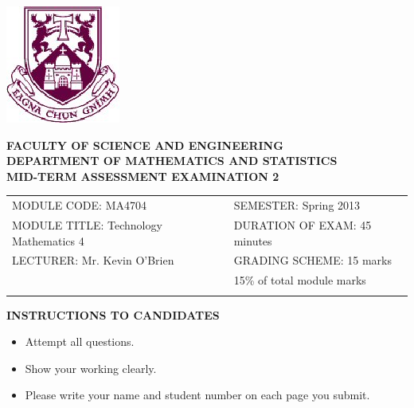 \documentclass{article}
\begin{document}
\begin{center}
       \includegraphics[scale=0.60]{shieldtransparent2}
\end{center}

\begin{center}
\vspace{1cm}
\large \bf {FACULTY OF SCIENCE AND ENGINEERING} \\[0.5cm]
\normalsize DEPARTMENT OF MATHEMATICS AND STATISTICS \\[1.25cm]
\large \bf {MID-TERM ASSESSMENT EXAMINATION 2} \\[1.5cm]
\end{center}

\begin{tabular}{ll}
MODULE CODE: MA4704 & SEMESTER: Spring 2013\\[1cm]
MODULE TITLE: Technology Mathematics 4 & DURATION OF EXAM: 45 minutes \\[1cm]
LECTURER: Mr. Kevin O'Brien & GRADING SCHEME: 15 marks \\
& \phantom{GRADING SCHEME:} \footnotesize {15\% of total module marks} \\[0.2cm]
\\[1cm]
\end{tabular}
\begin{center}
{\bf INSTRUCTIONS TO CANDIDATES}
\end{center}
\begin{itemize}
\item Attempt all questions.
\item Show your working clearly.
\item Please write your name and student number on each page you submit.
\end{itemize}
\end{document}
